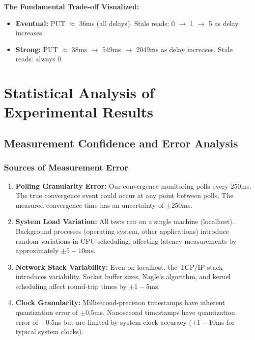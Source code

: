 \documentclass[10pt,a4paper]{article}
\begin{document}
\textbf{The Fundamental Trade-off Visualized:}

\begin{itemize}
    \item \textbf{Eventual:} PUT $\approx$ 36ms (all delays). Stale reads: 0 $\rightarrow$ 1 $\rightarrow$ 5 as delay increases.
    \item \textbf{Strong:} PUT $\approx$ 38ms $\rightarrow$ 549ms $\rightarrow$ 2049ms as delay increases. Stale reads: always 0.
\end{itemize}

\newpage

\section{Statistical Analysis of Experimental Results}

\subsection{Measurement Confidence and Error Analysis}

\subsubsection{Sources of Measurement Error}

\begin{enumerate}
    \item \textbf{Polling Granularity Error:} Our convergence monitoring polls every 250ms. The true convergence event could occur at any point between polls. The measured convergence time has an uncertainty of $\pm 250$ms.
    
    \item \textbf{System Load Variation:} All tests ran on a single machine (localhost). Background processes (operating system, other applications) introduce random variations in CPU scheduling, affecting latency measurements by approximately $\pm 5-10$ms.
    
    \item \textbf{Network Stack Variability:} Even on localhost, the TCP/IP stack introduces variability. Socket buffer sizes, Nagle's algorithm, and kernel scheduling affect round-trip times by $\pm 1-5$ms.
    
    \item \textbf{Clock Granularity:} Millisecond-precision timestamps have inherent quantization error of $\pm 0.5$ms. Nanosecond timestamps have quantization error of $\pm 0.5$ns but are limited by system clock accuracy ($\pm 1-10$ms for typical system clocks).
\end{enumerate}
\end{document}
